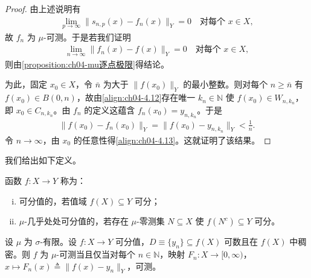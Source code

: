 \documentclass[../../main.tex]{subfiles}%
\begin{document}
\begin{proof}
由上述说明有
\begin{align*}
\lim_{p\to\infty}\|s_{n,p}(x)-f_n(x)\|_Y=0\quad\text{对每个 }x\in X,
\end{align*}
故 $f_n$ 为 $\mu$-可测。于是若我们证明
\begin{align}
\lim_{n\to\infty}\|f_n(x)-f(x)\|_Y=0\quad\text{对每个 }x\in X, \label{align:ch04-4.13}
\end{align}
则由\cref{proposition:ch04-mu逐点极限}得结论。

为此，固定 $x_0\in X$，令 $\bar n$ 为大于 $\|f(x_0)\|_Y$ 的最小整数。则对每个 $n\geqslant\bar n$ 有 $f(x_0)\in B(0,n)$，故由\eqref{align:ch04-4.12}存在唯一 $k_n\in\mathbb{N}$ 使 $f(x_0)\in W_{n,k_n}$，即 $x_0\in C_{n,k_n}$。由 $f_n$ 的定义这蕴含 $f_n(x_0)=y_{n,k_n}$。于是
\begin{align*}
\|f(x_0)-f_n(x_0)\|_Y=\|f(x_0)-y_{n,k_n}\|_Y<\frac1n.
\end{align*}
令 $n\to\infty$，由 $x_0$ 的任意性得\eqref{align:ch04-4.13}。这就证明了该结果。
\end{proof}

我们给出如下定义。

\begin{definition}[可分值]\label{definition:ch04-可分值}
函数 $f:X\to Y$ 称为：
\begin{enumerate}[(i)]
\item\label{item:ch04-可分值-i} 可分值的，若值域 $f(X)\subseteq Y$ 可分；
\item\label{item:ch04-可分值-ii} $\mu$-几乎处处可分值的，若存在 $\mu$-零测集 $N\subseteq X$ 使 $f(N^c)\subseteq Y$ 可分。
\end{enumerate}
\end{definition}

\begin{proposition}\label{proposition:ch04-可分值判据}
设 $\mu$ 为 $\sigma$-有限。设 $f:X\to Y$ 可分值，$D\equiv\{y_n\}\subseteq f(X)$ 可数且在 $f(X)$ 中稠密。则 $f$ 为 $\mu$-可测当且仅当对每个 $n\in\mathbb{N}$，映射 $F_n:X\to[0,\infty)$，$x\mapsto F_n(x)\triangleq \|f(x)-y_n\|_Y$，可测。
\end{proposition}
\end{document}
